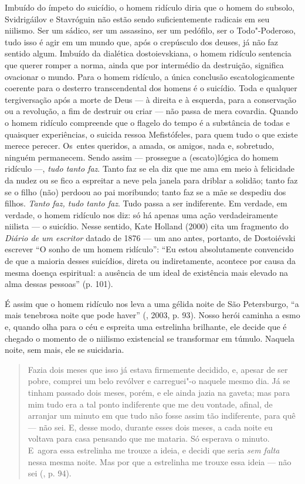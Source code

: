 Imbuído do ímpeto do suicídio, o homem ridículo diria que o homem do
subsolo, Svidrigáilov e Stavróguin não estão sendo suficientemente
radicais em seu niilismo. Ser um sádico, ser um assassino, ser um
pedófilo, ser o Todo"-Poderoso, tudo isso é agir em um mundo que, após o
crepúsculo dos deuses, já não faz sentido algum. Imbuído da dialética
dostoievskiana, o homem ridículo sentencia que querer romper a norma,
ainda que por intermédio da destruição, significa ovacionar o mundo.
Para o homem ridículo, a única conclusão escatologicamente coerente para
o desterro transcendental dos homens é o suicídio. Toda e qualquer
tergiversação após a morte de Deus --- à direita e à esquerda, para a
conservação ou a revolução, a fim de destruir ou criar --- não passa de
mera covardia. Quando o homem ridículo compreende que o flagelo do tempo
é a substância de todas e quaisquer experiências, o suicida ressoa
Mefistófeles, para quem tudo o que existe merece perecer. Os~entes
queridos, a amada, os amigos, nada e, sobretudo, ninguém permanecem.
Sendo assim --- prossegue a (escato)lógica do homem ridículo ---,
\emph{tudo tanto faz}. Tanto faz se ela diz que me ama em meio à
felicidade da nudez ou se fico a espreitar a neve pela janela para
driblar a solidão; tanto faz se o filho (não) perdoou ao pai moribundo;
tanto faz se a mãe se despediu dos filhos. \emph{Tanto faz, tudo tanto
faz}. Tudo passa a ser indiferente. Em verdade, em verdade, o homem
ridículo nos diz: só há apenas uma ação verdadeiramente niilista --- o
suicídio. Nesse sentido, Kate Holland (2000) cita um fragmento do
\emph{Diário de um escritor} datado de 1876 --- um ano antes, portanto,
de Dostoiévski escrever ``O sonho de um homem ridículo'': ``Eu estou
absolutamente convencido de que a maioria desses suicídios, direta ou
indiretamente, acontece por causa da mesma doença espiritual: a ausência
de um ideal de existência mais elevado na alma dessas pessoas'' (p.
101).

É assim que o homem ridículo nos leva a uma gélida noite de São
Petersburgo, ``a mais tenebrosa noite que pode haver'' (,
2003, p. 93). Nosso herói caminha a esmo e, quando olha para o céu e
espreita uma estrelinha brilhante, ele decide que é chegado o momento de
o niilismo existencial se transformar em túmulo. Naquela noite, sem
mais, ele se suicidaria.

\begin{quote}
Fazia dois meses que isso já estava firmemente decidido, e, apesar de
ser pobre, comprei um belo revólver e carreguei"-o naquele mesmo dia. Já
se tinham passado dois meses, porém, e ele ainda jazia na gaveta; mas
para mim tudo era a tal ponto indiferente que me deu vontade, afinal, de
arranjar um minuto em que tudo não fosse assim tão indiferente, para quê
--- não sei. E, desse modo, durante esses dois meses, a cada noite eu
voltava para casa pensando que me mataria. Só esperava o minuto. E~agora
essa estrelinha me trouxe a ideia, e decidi que seria \emph{sem falta}
nessa mesma noite. Mas por que a estrelinha me trouxe essa ideia --- não
sei (, p. 94).
\end{quote}

